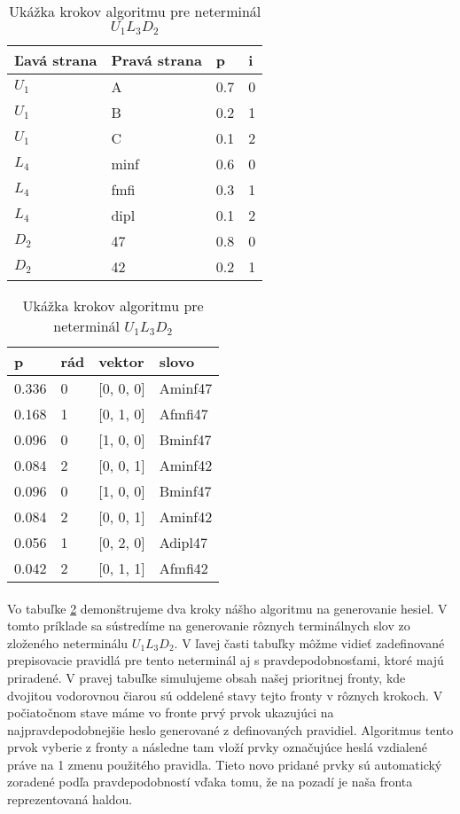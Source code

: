 \begin{table}[]
\centering
\caption{Ukážka krokov algoritmu pre neterminál \(U_1L_3D_2\)}
\label{postupAlgoritmu}
\begin{tabular}{l|lll}
Ľavá strana & Pravá strana & p & i \\ \hline
\(U_1\) & A & 0.7 & 0 \\
\(U_1\) & B & 0.2 & 1 \\
\(U_1\) & C & 0.1 & 2 \\
\(L_4\) & minf & 0.6 & 0 \\
\(L_4\) & fmfi & 0.3 & 1 \\
\(L_4\) & dipl & 0.1 & 2 \\
\(D_2\) & 47 & 0.8 & 0 \\
\(D_2\) & 42 & 0.2 & 1 \\
\end{tabular}
\quad
\begin{tabular}{llll}
p & rád & vektor & slovo \\ \hline
0.336 & 0 & [0, 0, 0] & Aminf47 \\ \hline \hline
0.168 & 1 & [0, 1, 0] & Afmfi47 \\
0.096 & 0 & [1, 0, 0] & Bminf47 \\
0.084 & 2 & [0, 0, 1] & Aminf42 \\ \hline \hline
0.096 & 0 & [1, 0, 0] & Bminf47 \\
0.084 & 2 & [0, 0, 1] & Aminf42 \\
0.056 & 1 & [0, 2, 0] & Adipl47 \\
0.042 & 2 & [0, 1, 1] & Afmfi42
\end{tabular}
\end{table}

\paragraph{}
Vo tabuľke \ref{postupAlgoritmu} demonštrujeme dva kroky nášho algoritmu na generovanie hesiel. V tomto príklade sa sústredíme na generovanie rôznych terminálnych slov zo zloženého neterminálu \(U_1L_3D_2\). V ľavej časti tabuľky môžme vidieť zadefinované prepisovacie pravidlá pre tento neterminál aj s pravdepodobnosťami, ktoré majú priradené. V pravej tabuľke simulujeme obsah našej prioritnej fronty, kde dvojitou vodorovnou čiarou sú oddelené stavy tejto fronty v rôznych krokoch. V počiatočnom stave máme vo fronte prvý prvok ukazujúci na najpravdepodobnejšie heslo generované z definovaných pravidiel. Algoritmus tento prvok vyberie z fronty a následne tam vloží prvky označujúce heslá vzdialené práve na 1 zmenu použitého pravidla. Tieto novo pridané prvky sú automatický zoradené podľa pravdepodobností vďaka tomu, že na pozadí je naša fronta reprezentovaná haldou. 

